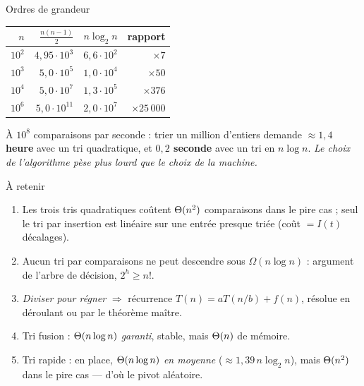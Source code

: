 \documentclass[11pt,aspectratio=169]{beamer}
\begin{document}
\begin{frame}{Ordres de grandeur}
\begin{center}\small
\begin{tabular}{rrrr}
\toprule
$n$ & $\frac{n(n-1)}2$ & $n\log_2 n$ & rapport\\
\midrule
$10^2$ & $4{,}95\cdot10^{3}$ & $6{,}6\cdot10^{2}$ & $\times 7$\\
$10^3$ & $5{,}0\cdot10^{5}$ & $1{,}0\cdot10^{4}$ & $\times 50$\\
$10^4$ & $5{,}0\cdot10^{7}$ & $1{,}3\cdot10^{5}$ & $\times 376$\\
$10^6$ & $5{,}0\cdot10^{11}$ & $2{,}0\cdot10^{7}$ & $\times 25\,000$\\
\bottomrule
\end{tabular}
\end{center}
\vspace{6pt}
\begin{encadre}\small
À $10^{8}$ comparaisons par seconde : trier un million d'entiers demande
\textbf{$\approx 1{,}4$ heure} avec un tri quadratique, et \textbf{$0{,}2$ seconde}
avec un tri en $n\log n$. \emph{Le choix de l'algorithme pèse plus lourd que le choix
de la machine.}
\end{encadre}
\end{frame}

\begin{frame}{À retenir}
\begin{encadre}[title=Les cinq points du chapitre,fonttitle=\bfseries]
\begin{enumerate}\setlength\itemsep{3pt}
  \item Les trois tris quadratiques coûtent $\Theta(n^2)$ comparaisons dans le pire cas ;
        seul le tri par insertion est linéaire sur une entrée presque triée
        (coût $=I(t)$ décalages).
  \item Aucun tri par comparaisons ne peut descendre sous $\Omega(n\log n)$ :
        argument de l'arbre de décision, $2^h\ge n!$.
  \item \emph{Diviser pour régner} $\Rightarrow$ récurrence $T(n)=aT(n/b)+f(n)$,
        résolue en déroulant ou par le théorème maître.
  \item Tri fusion : $\Theta(n\log n)$ \emph{garanti}, stable, mais $\Theta(n)$ de mémoire.
  \item Tri rapide : en place, $\Theta(n\log n)$ \emph{en moyenne}
        ($\approx1{,}39\,n\log_2 n$), mais $\Theta(n^2)$ dans le pire cas ---
        d'où le pivot aléatoire.
\end{enumerate}
\end{encadre}
\vspace{4pt}
\centering
{}
\end{frame}
\end{document}
